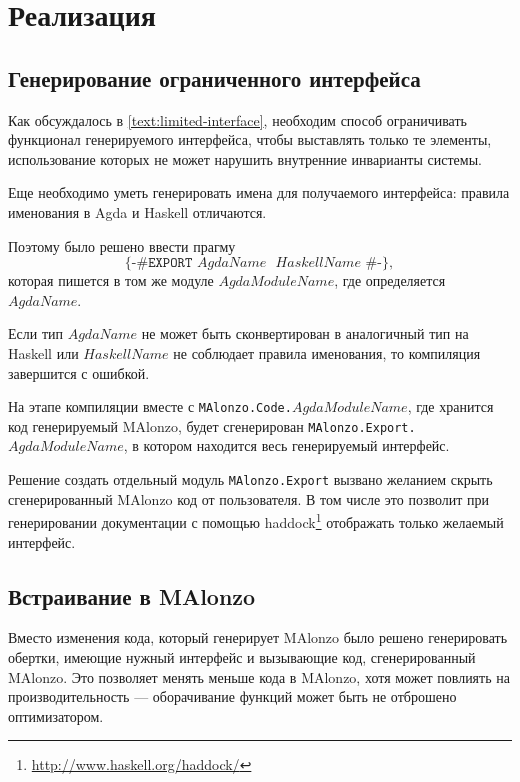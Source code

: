\section{Реализация}

\subsection{Генерирование ограниченного интерфейса}

Как обсуждалось в \ref{text:limited-interface}, необходим способ ограничивать
функционал генерируемого интерфейса, чтобы выставлять только те элементы,
использование которых не может нарушить внутренние инварианты системы.

Еще необходимо уметь генерировать имена для получаемого интерфейса:
правила именования в Agda и Haskell отличаются.

Поэтому было решено ввести прагму
\[
\texttt{\{-\# EXPORT \(AgdaName\) \(HaskellName\) \#-\}},
\]
которая пишется в том же модуле \(AgdaModuleName\), где определяется \(AgdaName\).

Если тип \(AgdaName\) не может быть сконвертирован в аналогичный тип на Haskell
или \(HaskellName\) не соблюдает правила именования, то компиляция завершится с ошибкой.

На этапе компиляции вместе с \texttt{MAlonzo.Code.\(AgdaModuleName\)}, где хранится
код генерируемый MAlonzo, будет сгенерирован \texttt{MAlonzo.Export.\(AgdaModuleName\)},
в котором находится весь генерируемый интерфейс.

Решение создать отдельный модуль \texttt{MAlonzo.Export} вызвано желанием скрыть
сгенерированный MAlonzo код от пользователя. В том числе это позволит
при генерировании документации с помощью
haddock\footnote{\url{http://www.haskell.org/haddock/}} отображать только желаемый
интерфейс.

\subsection{Встраивание в MAlonzo}

Вместо изменения кода, который генерирует MAlonzo было решено генерировать
обертки, имеющие нужный интерфейс и вызывающие код, сгенерированный MAlonzo.
Это позволяет менять меньше кода в MAlonzo, хотя может повлиять на производительность ---
оборачивание функций может быть не отброшено оптимизатором.

